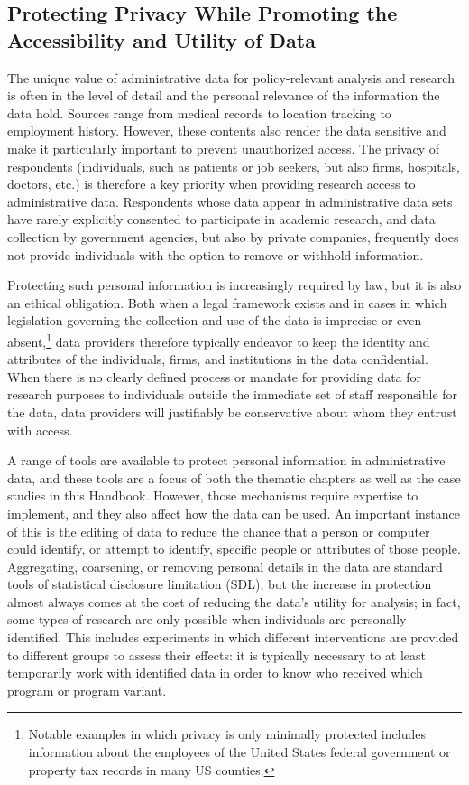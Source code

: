 \hypertarget{protecting-privacy-while-promoting-the-accessibility-and-utility-of-data}{%
\subsection{Protecting Privacy While Promoting the Accessibility and Utility of Data}\label{protecting-privacy-while-promoting-the-accessibility-and-utility-of-data}}

The unique value of administrative data for policy-relevant analysis and research is often in the level of detail and the personal relevance of the information the data hold. Sources range from medical records to location tracking to employment history. However, these contents also render the data sensitive and make it particularly important to prevent unauthorized access. The privacy of respondents (individuals, such as patients or job seekers, but also firms, hospitals, doctors, etc.) is therefore a key priority when providing research access to administrative data. Respondents whose data appear in administrative data sets have rarely explicitly consented to participate in academic research, and data collection by government agencies, but also by private companies, frequently does not provide individuals with the option to remove or withhold information.

Protecting such personal information is increasingly required by law, but it is also an ethical obligation. Both when a legal framework exists and in cases in which legislation governing the collection and use of the data is imprecise or even absent,\footnote{Notable examples in which privacy is only minimally protected includes information about the employees of the United States federal government or property tax records in many US counties.} data providers therefore typically endeavor to keep the identity and attributes of the individuals, firms, and institutions in the data confidential. When there is no clearly defined process or mandate for providing data for research purposes to individuals outside the immediate set of staff responsible for the data, data providers will justifiably be conservative about whom they entrust with access.

A range of tools are available to protect personal information in administrative data, and these tools are a focus of both the thematic chapters as well as the case studies in this Handbook. However, those mechanisms require expertise to implement, and they also affect how the data can be used. An important instance of this is the editing of data to reduce the chance that a person or computer could identify, or attempt to identify, specific people or attributes of those people. Aggregating, coarsening, or removing personal details in the data are standard tools of statistical disclosure limitation (SDL), but the increase in protection almost always comes at the cost of reducing the data's utility for analysis; in fact, some types of research are only possible when individuals are personally identified. This includes experiments in which different interventions are provided to different groups to assess their effects: it is typically necessary to at least temporarily work with identified data in order to know who received which program or program variant.

